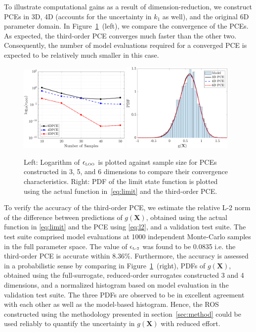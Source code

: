 To illustrate computational gains as a
result of dimension-reduction, we construct PCEs in 3D, 4D (accounts for the
uncertainty in $k_1$ as well), and the original 6D parameter domain. In
Figure~\ref{fig:conv_osc}~(left), we compare the convergence of the
PCEs. As expected, the third-order PCE converges much faster than the other
two. Consequently, the number of model evaluations required for a converged PCE
is expected to be relatively much smaller in this case.  
\begin{figure}[htbp]
 \begin{center}
  \includegraphics[width=0.48\textwidth]{./Figures/err_samples_oscillator}
  \includegraphics[width=0.48\textwidth]{./Figures/pdf_comp_oscillator}
\caption{Left: Logarithm of $\epsilon_{\mbox{\tiny{LOO}}}$ is plotted against sample size for 
PCEs constructed in 3, 5, and 6 dimensions to compare their convergence characteristics. 
Right: PDF of the limit state function is plotted using the actual function in~\eqref{eq:limit}
and the third-order PCE.}
\label{fig:conv_osc}
\end{center}
\end{figure}

To verify the accuracy of the third-order PCE, we estimate the relative L-2
norm of the difference between predictions of  $g(\bm{X})$, obtained using the
actual function in \eqref{eq:limit} and the 
PCE using \eqref{eq:l2}, and a validation test suite. The test suite comprised
model evaluations at 1000 independent Monte-Carlo samples in the full 
parameter space. The value of $\epsilon_{\mbox{\tiny{L-2}}}$ 
was found to be 0.0835 i.e. the third-order PCE is accurate within 8.36$\%$.
Furthermore, the accuracy is assessed in a probabilistic sense by comparing
in Figure~\ref{fig:conv_osc}~(right),
PDFs of $g(\bm{X})$, obtained using the full-surrogate, reduced-order 
surrogates constructed 3 and 4 dimensions, and a normalized histogram based
on model evaluation in the validation test suite. The three PDFs are observed
to be in excellent agreement with each other as well as the model-based
histogram. Hence, the ROS constructed using the methodology
presented in section~\ref{sec:method} could be used reliably to 
quantify the uncertainty in $g(\bm{X})$ with reduced effort.

